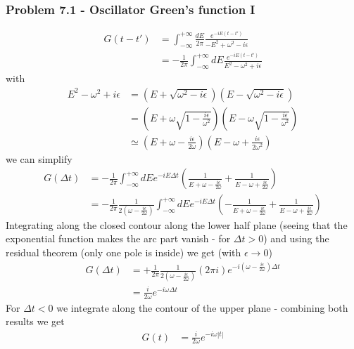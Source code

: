 \documentclass[10pt,a4paper]{article}
\theoremstyle{definition}
\begin{document}
\subsubsection{Problem 7.1 - Oscillator Green's function I}
\begin{align}
G(t-t')&=\int_{-\infty}^{+\infty}\frac{dE}{2\pi}\frac{e^{-iE(t-t')}}{-E^2+\omega^2-i\epsilon}\\
&=-\frac{1}{2\pi}\int_{-\infty}^{+\infty}dE\frac{e^{-iE(t-t')}}{E^2-\omega^2+i\epsilon}
\end{align}
with
\begin{align}
E^2-\omega^2+i\epsilon
&=(E+\sqrt{\omega^2-i\epsilon})(E-\sqrt{\omega^2-i\epsilon})\\
&=\left(E+\omega\sqrt{1-\frac{i\epsilon}{\omega^2}}\right)\left(E-\omega\sqrt{1-\frac{i\epsilon}{\omega^2}}\right)\\
&\simeq\left(E+\omega-\frac{i\epsilon}{2\omega}\right)\left(E-\omega+\frac{i\epsilon}{2\omega^2}\right)
\end{align}
we can simplify
\begin{align}
G(\Delta t)
&=-\frac{1}{2\pi}\int_{-\infty}^{+\infty}dEe^{-iE\Delta t}\left(\frac{1}{E+\omega-\frac{i\epsilon}{2\omega}}+\frac{1}{E-\omega+\frac{i\epsilon}{2\omega}}\right)\\
&=-\frac{1}{2\pi}\frac{1}{2\left(\omega-\frac{i\epsilon}{2\omega}\right)}\int_{-\infty}^{+\infty}dEe^{-iE\Delta t}\left(-\frac{1}{E+\omega-\frac{i\epsilon}{2\omega}}+\frac{1}{E-\omega+\frac{i\epsilon}{2\omega}}\right)
\end{align}
Integrating along the closed contour along the lower half plane (seeing that the exponential function makes the arc part vanish - for $\Delta t>0$) and using the residual theorem (only one pole is inside) we get (with $\epsilon\rightarrow0$)
\begin{align}
G(\Delta t)
&=+\frac{1}{2\pi}\frac{1}{2\left(\omega-\frac{i\epsilon}{2\omega}\right)}(2\pi i)e^{-i(\omega-\frac{i\epsilon}{2\omega})\Delta t}\\
&=\frac{i}{2\omega}e^{-i\omega\Delta t}
\end{align}
For $\Delta t<0$ we integrate along the contour of the upper plane - combining both results we get
\begin{align}
G(t)&=\frac{i}{2\omega}e^{-i\omega|t|}
\end{align}
\end{document}
